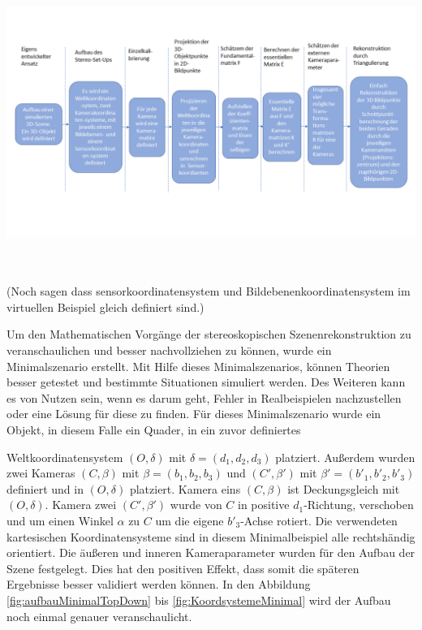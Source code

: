  
\begin{minipage}{\linewidth}
 	\centering
 	\includegraphics[width=1.\linewidth]{images/ArbeitsProzessMinimal.png}
 	\label{fig:ArbeitsProzessVirtuell}
\end{minipage}\\ \\
 
(Noch sagen dass sensorkoordinatensystem und Bildebenenkoordinatensystem im virtuellen Beispiel gleich definiert sind.)
 
Um den Mathematischen Vorgänge der stereoskopischen Szenenrekonstruktion zu veranschaulichen und besser nachvollziehen zu können, wurde ein Minimalszenario erstellt. Mit Hilfe dieses Minimalszenarios, können Theorien besser getestet und bestimmte Situationen simuliert werden. Des Weiteren kann es von Nutzen sein, wenn es darum geht, Fehler in Realbeispielen nachzustellen oder eine Lösung für diese zu finden. Für dieses Minimalszenario wurde ein Objekt, in diesem Falle ein Quader, in ein zuvor definiertes

Weltkoordinatensystem $(O,\delta)$ mit $\delta = (d_1,d_2,d_3)$ platziert. Außerdem wurden zwei Kameras $(C,\beta)$ mit $\beta = (b_1,b_2,b_3)$ und $(C',\beta')$ mit $\beta' = (b'_1,b'_2,b'_3)$ definiert und in $(O,\delta)$ platziert. Kamera eins $(C,\beta)$ ist Deckungsgleich mit $(O,\delta)$. Kamera zwei $(C',\beta')$ wurde von $C$ in positive $d_1$-Richtung, verschoben und um einen Winkel $\alpha$ zu $C$ um die eigene $b'_3$-Achse rotiert. Die verwendeten kartesischen Koordinatensysteme sind in diesem Minimalbeispiel alle rechtshändig orientiert. Die äußeren und inneren Kameraparameter wurden für den Aufbau der Szene festgelegt. Dies hat den positiven Effekt, dass somit die späteren Ergebnisse besser validiert werden können. In den Abbildung \ref{fig:aufbauMinimalTopDown} bis \ref{fig:KoordsystemeMinimal} wird der Aufbau noch einmal genauer veranschaulicht. \\


